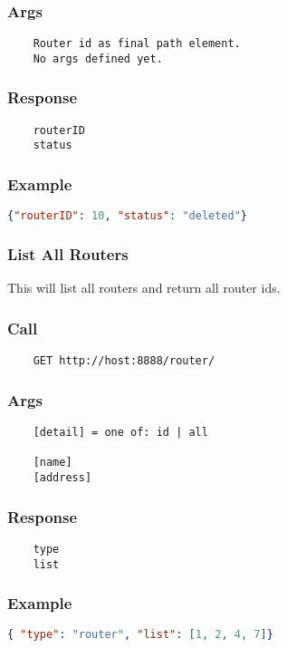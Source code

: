 \subsubsection*{Args}
\begin{verbatim}
	Router id as final path element.
	No args defined yet.
\end{verbatim}

\subsubsection*{Response}
\begin{verbatim}
	routerID
	status
\end{verbatim}

\subsubsection*{Example}
\begin{lstlisting}[language=json]
{"routerID": 10, "status": "deleted"}
\end{lstlisting}


\hr
\subsubsection{List All Routers}
This will list all routers and return all router ids.
\subsubsection*{Call}
\begin{verbatim}
	GET http://host:8888/router/
\end{verbatim}

\subsubsection*{Args}
\begin{verbatim}
	[detail] = one of: id | all
	
	[name]
	[address]
\end{verbatim}

\subsubsection*{Response}
\begin{verbatim}
	type
	list
\end{verbatim}

\subsubsection*{Example}
\begin{lstlisting}[language=json]
{ "type": "router", "list": [1, 2, 4, 7]}
\end{lstlisting}


